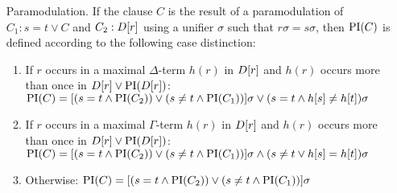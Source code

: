 \begin{defi}
\begin{itemize}
		\item[Paramodulation.]
	\label{def:PI_paramod}
			If the clause $C$ is the result of a paramodulation of $C_1: s=t \lor C$ and $C_2: D[r]$ using a unifier $\sigma$ such that $r\sigma = s\sigma$, then $\operatorname{PI}(C)$ is defined according to the following case distinction:
			\begin{enumerate}
				\item If $r$ occurs in a maximal $\Delta$-term $h(r)$ in $D[r]$ and $h(r)$ occurs more than once in $D[r] \lor \operatorname{PI}(D[r])$:
					\label{def:PI_paramod_1}
					\newline
					$\operatorname{PI}(C) = [ ( s=t \land \operatorname{PI}(C_2) ) \lor (s\neq t \land \operatorname{PI}(C_1)) ]\sigma \lor (s=t \land h[s] \neq h[t])\sigma$ 
				\item If $r$ occurs in a maximal $\Gamma$-term $h(r)$ in $D[r]$ and $h(r)$ occurs more than once in $D[r] \lor \operatorname{PI}(D[r])$:
					\label{def:PI_paramod_2}
					\newline
					$\operatorname{PI}(C) = [ ( s=t \land \operatorname{PI}(C_2) ) \lor (s\neq t \land \operatorname{PI}(C_1)) ]\sigma \land (s\neq t \lor h[s] = h[t])\sigma$ 
				\item Otherwise:
					\label{def:PI_paramod_3}
					\newline
					$\operatorname{PI}(C) = [ ( s=t \land \operatorname{PI}(C_2) ) \lor (s\neq t \land \operatorname{PI}(C_1)) ]\sigma$ \qedhere

			\end{enumerate}
	\end{itemize}
\end{defi}


